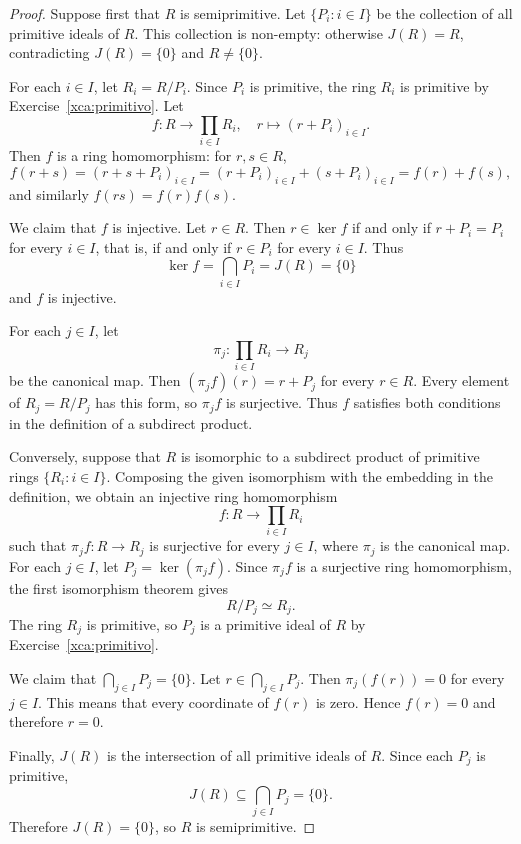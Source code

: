 \begin{proof}
    Suppose first that $R$ is semiprimitive. Let
    $\{P_i:i\in I\}$ be the collection of all primitive ideals of $R$.
    This collection is non-empty: otherwise $J(R)=R$, contradicting
    $J(R)=\{0\}$ and $R\ne\{0\}$.

    For each $i\in I$, let $R_i=R/P_i$. Since $P_i$ is primitive,
    the ring $R_i$ is primitive by Exercise~\ref{xca:primitivo}.
    Let 
    \[
        f\colon R\to\prod_{i\in I}R_i,
        \quad
        r\mapsto(r+P_i)_{i\in I}.
    \]
    Then $f$ is a ring homomorphism: for $r,s\in R$,
    \[
        f(r+s)
        =(r+s+P_i)_{i\in I}
        =(r+P_i)_{i\in I}+(s+P_i)_{i\in I}
        =f(r)+f(s),
    \]
    and similarly $f(rs)=f(r)f(s)$.

    We claim that $f$ is injective. Let $r\in R$. Then 
	$r\in \ker f$ if and only if $r+P_i=P_i$ for every $i\in I$,
    that is, if and only if $r\in P_i$ for every $i\in I$.
    Thus 
    \[
        \ker f=\bigcap_{i\in I}P_i=J(R)=\{0\}
    \]
    and $f$ is injective.

    For each $j\in I$, let
    \[
        \pi_j\colon\prod_{i\in I}R_i\to R_j
    \]
    be the canonical map. Then
   	$(\pi_jf)(r)=r+P_j$ 
    for every $r\in R$. Every element of $R_j=R/P_j$ has this
    form, so $\pi_jf$ is surjective. Thus $f$ satisfies both
    conditions in the definition of a subdirect product.

    Conversely, suppose that $R$ is isomorphic to a subdirect
    product of primitive rings $\{R_i:i\in I\}$. Composing the
    given isomorphism with the embedding in the definition,
    we obtain an injective ring homomorphism
    \[
        f\colon R\to\prod_{i\in I}R_i
    \]
    such that $\pi_jf\colon R\to R_j$ is surjective for every
    $j\in I$, where $\pi_j$ is the canonical map.
    For each $j\in I$, let
    $P_j=\ker(\pi_jf)$. 
    Since $\pi_jf$ is a surjective ring homomorphism,
    the first isomorphism theorem gives
    \[
        R/P_j\simeq R_j.
    \]
    The ring $R_j$ is primitive, so $P_j$ is a primitive ideal
    of $R$ by Exercise~\ref{xca:primitivo}.

    We claim that $\bigcap_{j\in I}P_j=\{0\}$.
    Let $r\in\bigcap_{j\in I}P_j$. Then
    $\pi_j(f(r))=0$ 
    for every $j\in I$. 
    This means that every coordinate of $f(r)$ is zero.
    Hence $f(r)=0$ and therefore $r=0$. 

    Finally, $J(R)$ is the intersection of all primitive ideals
    of $R$. Since each $P_j$ is primitive, 
    \[
        J(R)\subseteq\bigcap_{j\in I}P_j=\{0\}.
    \]
    Therefore $J(R)=\{0\}$, so $R$ is semiprimitive.
\end{proof}

